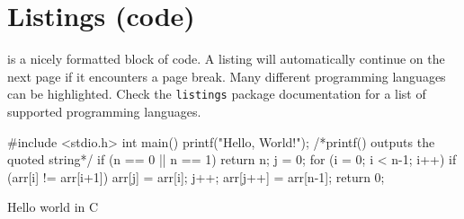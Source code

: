 \section{Listings (code)}

 is a nicely formatted block of code. A listing will automatically continue on the next page if it encounters a page break. Many different programming languages can be highlighted. Check the \texttt{listings} package documentation for a list of supported programming languages.

\begin{listing}[htbp]
\begin{mintedc}
#include <stdio.h>
int main()
{
	printf("Hello, World!"); /*printf() outputs the quoted string*/
	if (n == 0 || n == 1){
		return n;
	}
	j = 0;
	for (i = 0; i < n-1; i++){
		if (arr[i] != arr[i+1]){
			arr[j] = arr[i];
			j++;
		}
	}
	arr[j++] = arr[n-1];
	return 0;
}
\end{mintedc}
	\caption{Hello world in C}
	\label{lst:helloworld}
\end{listing}



